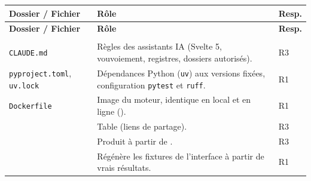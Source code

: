\documentclass[11pt,a4paper]{article}
\begin{document}
\begin{appendices}
\renewcommand{\arraystretch}{1.15}
\begin{longtable}{@{}L{6.4cm} >{\raggedright\arraybackslash}p{\dimexpr\textwidth-7.9cm-4\tabcolsep\relax} L{1.5cm}@{}}
  \toprule
  \textbf{Dossier / Fichier} & \textbf{Rôle} & \textbf{Resp.} \\
  \midrule
  \endfirsthead
  \toprule
  \textbf{Dossier / Fichier} & \textbf{Rôle} & \textbf{Resp.} \\
  \midrule
  \endhead
  \bottomrule
  \endfoot

   \\
  \texttt{CLAUDE.md} & Règles des assistants IA (Svelte 5, vouvoiement, registres, dossiers autorisés). & R3 \\
  \texttt{pyproject.toml}, \texttt{uv.lock} & Dépendances Python (\texttt{uv}) aux versions fixées, configuration \texttt{pytest} et \texttt{ruff}. & R1 \\
  \texttt{Dockerfile} & Image du moteur, identique en local et en ligne (). & R1 \\
   & Table  (liens de partage). & R3 \\
   & Produit  à partir de . & R3 \\
   & Régénère les fixtures de l'interface à partir de vrais résultats. & R1 \\


\end{longtable}
\end{appendices}
\end{document}
